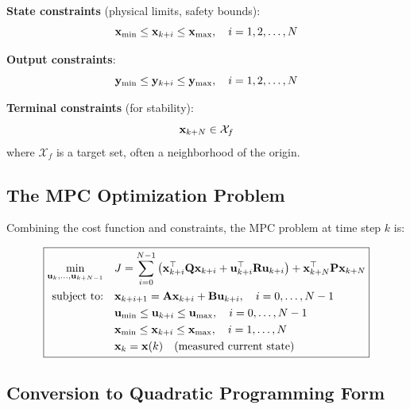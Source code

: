 \textbf{State constraints} (physical limits, safety bounds):
\begin{equation}
    \mathbf{x}_{\min} \leq \mathbf{x}_{k+i} \leq \mathbf{x}_{\max}, \quad i = 1, 2, \ldots, N
\label{eq:state_constraints}
\end{equation}

\textbf{Output constraints}:
\begin{equation}
    \mathbf{y}_{\min} \leq \mathbf{y}_{k+i} \leq \mathbf{y}_{\max}, \quad i = 1, 2, \ldots, N
\label{eq:output_constraints}
\end{equation}

\textbf{Terminal constraints} (for stability):
\begin{equation}
    \mathbf{x}_{k+N} \in \mathcal{X}_f
\label{eq:terminal_constraint}
\end{equation}
where $\mathcal{X}_f$ is a target set, often a neighborhood of the origin.

\subsection{The MPC Optimization Problem}

Combining the cost function and constraints, the MPC problem at time step $k$ is:

\begin{equation}
\boxed{
\begin{aligned}
    \min_{\mathbf{u}_k, \ldots, \mathbf{u}_{k+N-1}} \quad & J = \sum_{i=0}^{N-1} \left( \mathbf{x}_{k+i}^\top \mathbf{Q} \mathbf{x}_{k+i} + \mathbf{u}_{k+i}^\top \mathbf{R} \mathbf{u}_{k+i} \right) + \mathbf{x}_{k+N}^\top \mathbf{P} \mathbf{x}_{k+N} \\
    \text{subject to:} \quad & \mathbf{x}_{k+i+1} = \mathbf{A}\mathbf{x}_{k+i} + \mathbf{B}\mathbf{u}_{k+i}, \quad i = 0, \ldots, N-1 \\
    & \mathbf{u}_{\min} \leq \mathbf{u}_{k+i} \leq \mathbf{u}_{\max}, \quad i = 0, \ldots, N-1 \\
    & \mathbf{x}_{\min} \leq \mathbf{x}_{k+i} \leq \mathbf{x}_{\max}, \quad i = 1, \ldots, N \\
    & \mathbf{x}_k = \mathbf{x}(k) \quad \text{(measured current state)}
\end{aligned}
}
\label{eq:mpc_problem}
\end{equation}

\subsection{Conversion to Quadratic Programming Form}

